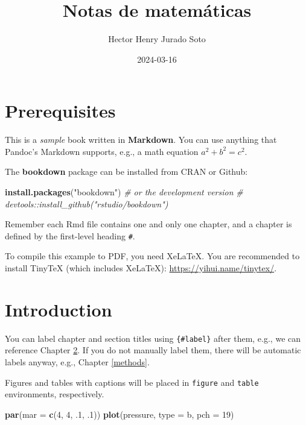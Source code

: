 \documentclass[
]{book}
\title{Notas de matemáticas}
\author{Hector Henry Jurado Soto}
\date{2024-03-16}
\newenvironment{Shaded}{\begin{snugshade}}{\end{snugshade}}
\newcommand{\AttributeTok}[1]{\textcolor[rgb]{0.13,0.29,0.53}{#1}}
\newcommand{\CommentTok}[1]{\textcolor[rgb]{0.56,0.35,0.01}{\textit{#1}}}
\newcommand{\DecValTok}[1]{\textcolor[rgb]{0.00,0.00,0.81}{#1}}
\newcommand{\FunctionTok}[1]{\textcolor[rgb]{0.13,0.29,0.53}{\textbf{#1}}}
\newcommand{\NormalTok}[1]{#1}
\newcommand{\StringTok}[1]{\textcolor[rgb]{0.31,0.60,0.02}{#1}}
\theoremstyle{definition}
\theoremstyle{definition}
\theoremstyle{definition}
\theoremstyle{definition}
\theoremstyle{remark}
\begin{document}
\maketitle

{
\setcounter{tocdepth}{1}
\tableofcontents
}
\hypertarget{prerequisites}{%
\chapter{Prerequisites}\label{prerequisites}}

This is a \emph{sample} book written in \textbf{Markdown}. You can use anything that Pandoc's Markdown supports, e.g., a math equation \(a^2 + b^2 = c^2\).

The \textbf{bookdown} package can be installed from CRAN or Github:

\begin{Shaded}
\begin{Highlighting}[]
\FunctionTok{install.packages}\NormalTok{(}\StringTok{"bookdown"}\NormalTok{)}
\CommentTok{\# or the development version}
\CommentTok{\# devtools::install\_github("rstudio/bookdown")}
\end{Highlighting}
\end{Shaded}

Remember each Rmd file contains one and only one chapter, and a chapter is defined by the first-level heading \texttt{\#}.

To compile this example to PDF, you need XeLaTeX. You are recommended to install TinyTeX (which includes XeLaTeX): \url{https://yihui.name/tinytex/}.

\hypertarget{intro}{%
\chapter{Introduction}\label{intro}}

You can label chapter and section titles using \texttt{\{\#label\}} after them, e.g., we can reference Chapter \ref{intro}. If you do not manually label them, there will be automatic labels anyway, e.g., Chapter \ref{methods}.

Figures and tables with captions will be placed in \texttt{figure} and \texttt{table} environments, respectively.

\begin{Shaded}
\begin{Highlighting}[]
\FunctionTok{par}\NormalTok{(}\AttributeTok{mar =} \FunctionTok{c}\NormalTok{(}\DecValTok{4}\NormalTok{, }\DecValTok{4}\NormalTok{, .}\DecValTok{1}\NormalTok{, .}\DecValTok{1}\NormalTok{))}
\FunctionTok{plot}\NormalTok{(pressure, }\AttributeTok{type =} \StringTok{\textquotesingle{}b\textquotesingle{}}\NormalTok{, }\AttributeTok{pch =} \DecValTok{19}\NormalTok{)}
\end{Highlighting}
\end{Shaded}
\end{document}
